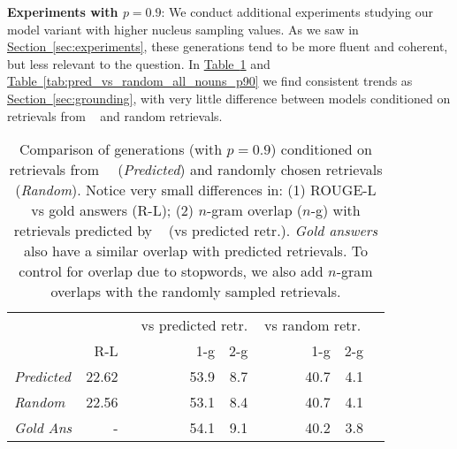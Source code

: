 \documentclass[11pt]{article}
\newcommand{\namedref}[2]{\hyperref[#2]{#1~\ref*{#2}}}
\newcommand{\sectionref}[1]{\namedref{Section}{#1}}
\newcommand{\tableref}[1]{\namedref{Table}{#1}}
\newcommand{\retriever}[1]{\textsc{c-REALM}}
\begin{document}
\noindent \textbf{Experiments with $p=0.9$}: We conduct additional experiments studying our model variant with higher nucleus sampling values. As we saw in \sectionref{sec:experiments}, these generations tend to be more fluent and coherent, but less relevant to the question. In \tableref{tab:pred_vs_random_all_p90} and \tableref{tab:pred_vs_random_all_nouns_p90} we find consistent trends as \sectionref{sec:grounding}, with very little difference between models conditioned on retrievals from \retriever~ and random retrievals.



\begin{table}[t]
\small
\begin{center}
\begin{tabular}{ lrrrrrr } 
 \toprule
 & & \multicolumn{2}{r}{vs predicted retr.} & \multicolumn{2}{c}{vs random retr.} \\
  & R-L & ~~~~~~~~~1-g & 2-g & ~~~~~~~1-g & 2-g \\
\midrule
\emph{Predicted} & 22.62 & 53.9 & 8.7 & 40.7 & 4.1 \\
\emph{Random} & 22.56 & 53.1 & 8.4 & 40.7 & 4.1 \\
\midrule
\emph{Gold Ans} & - & 54.1 & 9.1 & 40.2 & 3.8 \\
\bottomrule
\end{tabular}
\end{center}
\caption{Comparison of generations (with $p=0.9$) conditioned on retrievals from~\retriever~ (\emph{Predicted}) and randomly chosen retrievals (\emph{Random}). Notice very small differences in: (1) ROUGE-L vs gold answers (R-L); (2) $n$-gram overlap ($n$-g) with retrievals predicted by \retriever~ (vs predicted retr.). \emph{Gold answers} also have a similar overlap with predicted retrievals. To control for overlap due to stopwords, we also add $n$-gram overlaps with the randomly sampled retrievals.}
\label{tab:pred_vs_random_all_p90}
\end{table}
\end{document}
